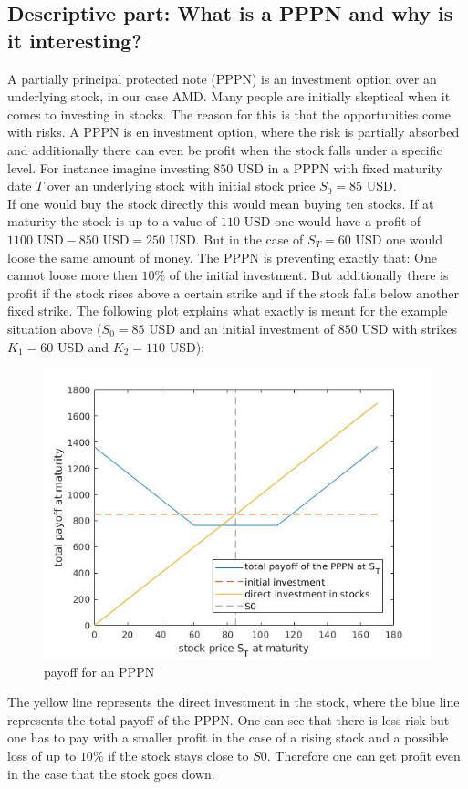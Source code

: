 \documentclass[11pt,oneside,a4paper]{article}
\begin{document}
	\subsection{Descriptive part: What is a PPPN and why is it interesting?}
	A partially principal protected note (PPPN) is an investment option over an underlying stock, in our case AMD. Many people are initially skeptical when it comes to investing in stocks. The reason for this is that the opportunities come with risks. A PPPN is en investment option, where the risk is partially absorbed and additionally there can even be profit when the stock falls under a specific level. For instance imagine investing $850 \text{ USD}$ in a PPPN with fixed maturity date $ T $ over an underlying stock with initial stock price $ S_0 = 85 \text{ USD} $.\\
	 If one would buy the stock directly this would mean buying ten stocks. If at maturity the stock is up to a value of $ 110 \text{ USD} $ one would have a profit of $ 1100 \text{ USD} - 850 \text{ USD} = 250 \text{ USD}  $. But in the case of $ S_T = 60 \text{ USD} $ one would loose the same amount of money.
	 The PPPN is preventing exactly that: One cannot loose more then $ 10 \% $ of the initial investment. But additionally there is profit if the stock rises above a certain strike $\underline{\text{and}}$ if the stock falls below another fixed strike. The following plot explains what exactly is meant for the example situation above ($ S_0 = 85 \text{ USD}$ and an initial investment of $ 850 \text{ USD} $ with strikes $ K_1 = 60\text{ USD} $ and  $ K_2 = 110\text{ USD} $): 
	\begin{figure}[H]
		\centering
		\includegraphics[width=0.8\linewidth]{payoff_PPPN.jpg}
		 \caption{payoff for an PPPN}
	\end{figure} 
	The yellow line represents the direct investment in the stock, where the blue line represents the total payoff of the PPPN. One can see that there is less risk but one has to pay with a smaller profit in the case of a rising stock and a possible loss of up to $ 10 \% $ if the stock stays close to $ S0 $.  Therefore one can get profit even in the case that the stock goes down.
\end{document}

